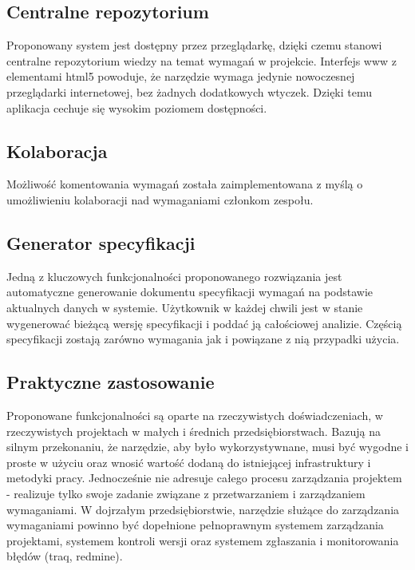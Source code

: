     \subsection{Centralne repozytorium}
      Proponowany system jest dostępny przez przeglądarkę, dzięki czemu stanowi centralne repozytorium wiedzy na temat wymagań w projekcie. Interfejs www z elementami html5 powoduje, że narzędzie wymaga jedynie nowoczesnej przeglądarki internetowej, bez żadnych dodatkowych wtyczek. Dzięki temu aplikacja cechuje się wysokim poziomem dostępności.  

    \subsection{Kolaboracja}
      Możliwość komentowania wymagań została zaimplementowana z myślą o umożliwieniu kolaboracji nad wymaganiami członkom zespołu.

    \subsection{Generator specyfikacji}
      Jedną z kluczowych funkcjonalności proponowanego rozwiązania jest automatyczne generowanie dokumentu specyfikacji wymagań na podstawie aktualnych danych w systemie.
      Użytkownik w każdej chwili jest w stanie wygenerować bieżącą wersję specyfikacji i poddać ją całościowej analizie. Częścią specyfikacji zostają zarówno wymagania jak i powiązane z nią przypadki użycia.

    \subsection{Praktyczne zastosowanie}
      Proponowane funkcjonalności są oparte na rzeczywistych doświadczeniach, w rzeczywistych projektach w małych i średnich przedsiębiorstwach. Bazują na silnym przekonaniu, że narzędzie, aby było wykorzystywnane, musi być wygodne i proste w użyciu oraz wnosić wartość dodaną do istniejącej infrastruktury i metodyki pracy. Jednocześnie nie adresuje całego procesu zarządzania projektem - realizuje tylko swoje zadanie związane z przetwarzaniem i zarządzaniem wymaganiami. W dojrzałym przedsiębiorstwie, narzędzie służące do zarządzania wymaganiami powinno być dopełnione pełnoprawnym systemem zarządzania projektami, systemem kontroli wersji oraz systemem zgłaszania i monitorowania błędów (traq, redmine).
